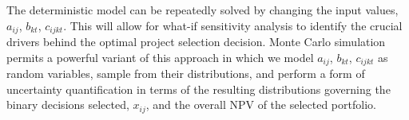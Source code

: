 The deterministic model can be repeatedly solved by changing the input values,
$a_{ij}$, $b_{kt}$, $c_{ijkt}$. This will allow for what-if sensitivity analysis to identify the
crucial drivers behind the optimal project selection decision. Monte Carlo simulation permits a
powerful variant of this approach in which we model $a_{ij}$, $b_{kt}$, $c_{ijkt}$ as random
variables, sample from their distributions, and perform a form of uncertainty quantification
in terms of the resulting distributions governing the binary decisions selected, $x_{ij}$, and
the overall NPV of the selected portfolio.
